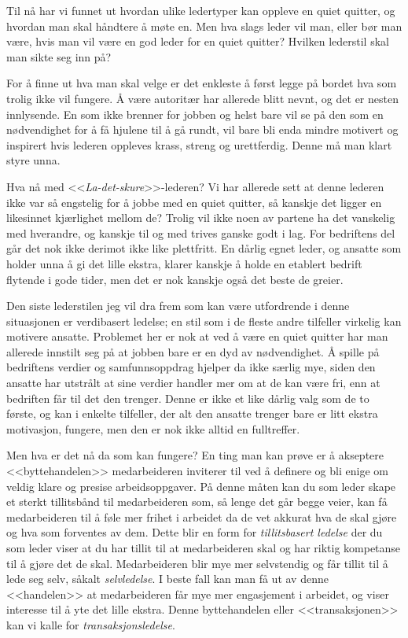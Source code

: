 \documentclass[a4paper, 12pt]{article}  %
\begin{document}
Til nå har vi funnet ut hvordan ulike ledertyper kan oppleve en quiet quitter, og hvordan man skal håndtere å møte en. 
Men hva slags leder vil man, eller bør man være, hvis man vil være en god leder for en quiet quitter? 
Hvilken lederstil skal man sikte seg inn på?

For å finne ut hva man skal velge er det enkleste å først legge på bordet hva som trolig ikke vil fungere. 
Å være autoritær har allerede blitt nevnt, og det er nesten innlysende. 
En som ikke brenner for jobben og helst bare vil se på den som en nødvendighet for å få hjulene til å gå rundt, vil bare bli enda mindre motivert og inspirert hvis lederen oppleves krass, streng og urettferdig.
Denne må man klart styre unna.

Hva nå med <<\emph{La-det-skure}>>-lederen? 
Vi har allerede sett at denne lederen ikke var så engstelig for å jobbe med en quiet quitter, så kanskje det ligger en likesinnet kjærlighet mellom de? 
Trolig vil ikke noen av partene ha det vanskelig med hverandre, og kanskje til og med trives ganske godt i lag. 
For bedriftens del går det nok ikke derimot ikke like plettfritt.
En dårlig egnet leder, og ansatte som holder unna å gi det lille ekstra, klarer kanskje å holde en etablert bedrift flytende i gode tider, men det er nok kanskje også det beste de greier.

Den siste lederstilen jeg vil dra frem som kan være utfordrende i denne situasjonen er verdibasert ledelse; en stil som i de fleste andre tilfeller virkelig kan motivere ansatte. 
Problemet her er nok at ved å være en quiet quitter har man allerede innstilt seg på at jobben bare er en dyd av nødvendighet.
Å spille på bedriftens verdier og samfunnsoppdrag hjelper da ikke særlig mye, siden den ansatte har utstrålt at sine verdier handler mer om at de kan være fri, enn at bedriften får til det den trenger.
Denne er ikke et like dårlig valg som de to første, og kan i enkelte tilfeller, der alt den ansatte trenger bare er litt ekstra motivasjon, fungere, men den er nok ikke alltid en fulltreffer.

Men hva er det nå da som kan fungere? 
En ting man kan prøve er å akseptere <<byttehandelen>> medarbeideren inviterer til ved å definere og bli enige om veldig klare og presise arbeidsoppgaver.
På denne måten kan du som leder skape et sterkt tillitsbånd til medarbeideren som, så lenge det går begge veier, kan få medarbeideren til å føle mer frihet i arbeidet da de vet akkurat hva de skal gjøre og hva som forventes av dem. 
Dette blir en form for \emph{tillitsbasert ledelse} der du som leder viser at du har tillit til at medarbeideren skal og har riktig kompetanse til å gjøre det de skal. 
Medarbeideren blir mye mer selvstendig og får tillit til å lede seg selv, såkalt \emph{selvledelse}.
I beste fall kan man få ut av denne <<handelen>> at medarbeideren får mye mer engasjement i arbeidet, og viser interesse til å yte det lille ekstra. Denne byttehandelen eller <<transaksjonen>> kan vi kalle for \emph{transaksjonsledelse}.
\end{document}
